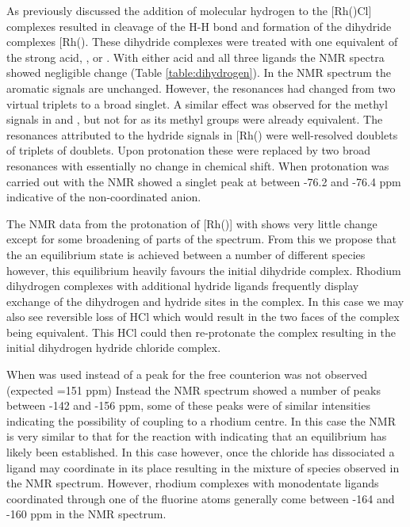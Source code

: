 
As previously discussed the addition of molecular hydrogen to the [Rh(\tBuxantphosk)Cl] complexes resulted in cleavage of the H-H bond and formation of the dihydride complexes [Rh(\tBuxantphosk)\ce{(H)2Cl]}.  These dihydride complexes were treated with one equivalent of the strong acid, , or .  With either acid and all three \tBuxantphos{} ligands the \phosphorus{} NMR spectra showed negligible change (Table \ref{table:dihydrogen}).  In the \proton{} NMR spectrum the aromatic signals are unchanged.  However, the \tBu{} resonances had changed from two virtual triplets to a broad singlet.  A similar effect was observed for the methyl signals in \tBuxantphos{} and \tBusixantphos{}, but not for \tButhixantphos{} as its methyl groups were already equivalent.  The resonances attributed to the hydride signals in [Rh(\tBuxantphosk)\ce{(H)2Cl]} were well-resolved doublets of triplets of doublets.  Upon protonation these were replaced by two broad resonances with essentially no change in chemical shift.  When protonation was carried out with  the \fluorine{} NMR showed a singlet peak at between -76.2 and -76.4 ppm indicative of the non-coordinated  anion.

The NMR data from the protonation of [Rh(\tBuxantphosk)] with  shows very little change except for some broadening of parts of the spectrum.  From this we propose that the an equilibrium state is achieved between a number of different species however, this equilibrium heavily favours the initial dihydride complex.  Rhodium dihydrogen complexes with additional hydride ligands frequently display exchange of the dihydrogen and hydride sites in the complex.  In this case we may also see reversible loss of HCl which would result in the two faces of the complex being equivalent.  This HCl could then re-protonate the complex resulting in the initial dihydrogen hydride chloride complex.  

When  was used instead of  a peak for the free  counterion was not observed (expected =151 ppm\cite{Feller2007})  Instead the \fluorine{} NMR spectrum showed a number of peaks between -142 and -156 ppm, some of these peaks were of similar intensities indicating the possibility of coupling to a rhodium centre.  In this case the \proton{} NMR is very similar to that for the reaction with  indicating that an equilibrium has likely been established.  In this case however, once the chloride has dissociated a  ligand may coordinate in its place resulting in the mixture of species observed in the \fluorine{} NMR spectrum.   However, rhodium complexes with monodentate  ligands coordinated through one of the fluorine atoms generally come between -164 and -160 ppm in the \fluorine{} NMR spectrum.\cite{Feller2007, Salem2006, Salem2008, Gandelman2003}


